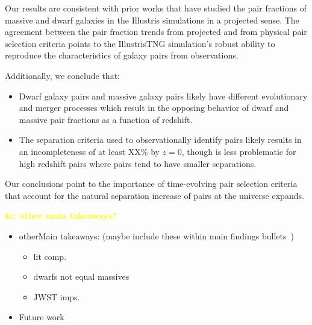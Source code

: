 \documentclass[twocolumn]{aastex631}
\newcommand{\kc}[1]{\textcolor{yellow}{\textbf{kc: #1}} }
\begin{document}
Our results are consistent with prior works that have studied the pair fractions of massive and dwarf galaxies in the Illustris simulations in a projected sense. 
The agreement between the pair fraction trends from projected and from physical pair selection criteria points to the IllustrisTNG simulation's robust ability to reproduce the characteristics of galaxy pairs from observations. 

Additionally, we conclude that:
\begin{itemize}
    \item Dwarf galaxy pairs and massive galaxy pairs likely have different evolutionary and merger processes which result in the opposing behavior of dwarf and massive pair fractions as a function of redshift.
    \item The separation criteria used to observationally identify pairs likely results in an incompleteness of at least XX\% by $z=0$, though is less problematic for high redshift pairs where pairs tend to have smaller separations. 
\end{itemize}

Our conclusions point to the importance of time-evolving pair selection criteria that account for the natural separation increase of pairs at the universe expands. 


\kc{other main takeaways?}

\begin{itemize}
    \item otherMain takeaways: (maybe include these within main findings bullets~)
        \begin{itemize}
            \item lit comp.
            \item dwarfs not equal massives 
            \item JWST imps.
        \end{itemize}
    \item Future work
\end{itemize}



{}

\end{document}
